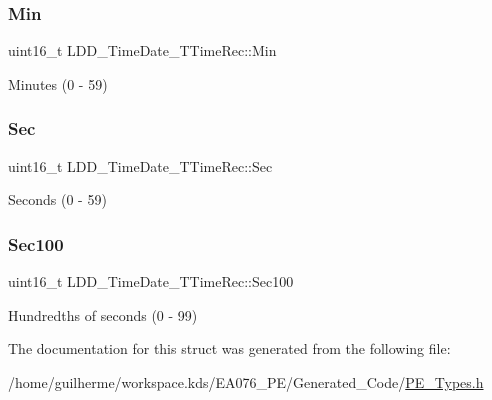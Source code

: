\subsubsection{\texorpdfstring{Min}{Min}}
{\footnotesize\ttfamily uint16\+\_\+t L\+D\+D\+\_\+\+Time\+Date\+\_\+\+T\+Time\+Rec\+::\+Min}

Minutes (0 -\/ 59) \mbox{\label{struct_l_d_d___time_date___t_time_rec_a05cccc86e89e5704b0460caaf2429f75}} 
\subsubsection{\texorpdfstring{Sec}{Sec}}
{\footnotesize\ttfamily uint16\+\_\+t L\+D\+D\+\_\+\+Time\+Date\+\_\+\+T\+Time\+Rec\+::\+Sec}

Seconds (0 -\/ 59) \mbox{\label{struct_l_d_d___time_date___t_time_rec_a2cd2e13e7c478f04ea1c4c460b104491}} 
\subsubsection{\texorpdfstring{Sec100}{Sec100}}
{\footnotesize\ttfamily uint16\+\_\+t L\+D\+D\+\_\+\+Time\+Date\+\_\+\+T\+Time\+Rec\+::\+Sec100}

Hundredths of seconds (0 -\/ 99) 

The documentation for this struct was generated from the following file\+:\begin{DoxyCompactItemize}
\item 
/home/guilherme/workspace.\+kds/\+E\+A076\+\_\+\+P\+E/\+Generated\+\_\+\+Code/\hyperlink{_p_e___types_8h}{P\+E\+\_\+\+Types.\+h}\end{DoxyCompactItemize}

